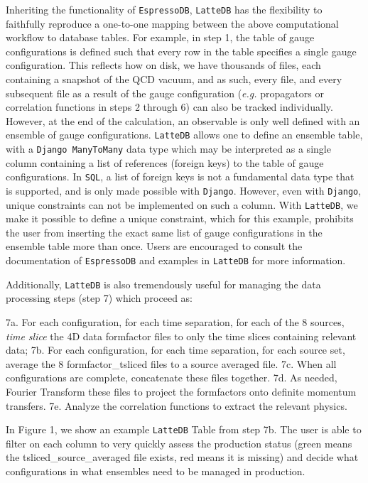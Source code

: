 Inheriting the functionality of \texttt{EspressoDB}, \texttt{LatteDB}
has the flexibility to faithfully reproduce a one-to-one mapping between
the above computational workflow to database tables. For example, in
step 1, the table of gauge configurations is defined such that every row
in the table specifies a single gauge configuration. This reflects how
on disk, we have thousands of files, each containing a snapshot of the
QCD vacuum, and as such, every file, and every subsequent file as a
result of the gauge configuration (\emph{e.g.} propagators or
correlation functions in steps 2 through 6) can also be tracked
individually. However, at the end of the calculation, an observable is
only well defined with an ensemble of gauge configurations.
\texttt{LatteDB} allows one to define an ensemble table, with a
\texttt{Django\ ManyToMany} data type which may be interpreted as a
single column containing a list of references (foreign keys) to the
table of gauge configurations. In \texttt{SQL}, a list of foreign keys
is not a fundamental data type that is supported, and is only made
possible with \texttt{Django}. However, even with \texttt{Django},
unique constraints can not be implemented on such a column. With
\texttt{LatteDB}, we make it possible to define a unique constraint,
which for this example, prohibits the user from inserting the exact same
list of gauge configurations in the ensemble table more than once. Users
are encouraged to consult the documentation of \texttt{EspressoDB} and
examples in \texttt{LatteDB} for more information.

Additionally, \texttt{LatteDB} is also tremendously useful for managing
the data processing steps (step 7) which proceed as:

7a. For each configuration, for each time separation, for each of the 8
sources, \emph{time slice} the 4D data formfactor files to only the time
slices containing relevant data; 7b. For each configuration, for each
time separation, for each source set, average the 8 formfactor\_tsliced
files to a source averaged file. 7c. When all configurations are
complete, concatenate these files together. 7d. As needed, Fourier
Transform these files to project the formfactors onto definite momentum
transfers. 7e. Analyze the correlation functions to extract the relevant
physics.

In Figure 1, we show an example \texttt{LatteDB} Table from step 7b. The
user is able to filter on each column to very quickly assess the
production status (green means the tsliced\_source\_averaged file
exists, red means it is missing) and decide what configurations in what
ensembles need to be managed in production.

